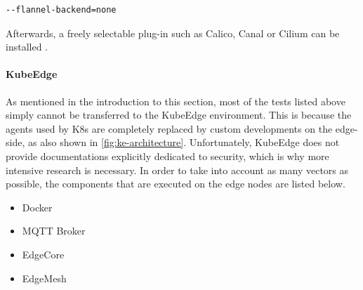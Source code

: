 \documentclass[MSC,Master,english]{twbook}%
\begin{document}
\begin{lstlisting}[caption={K3s no Flannel},captionpos=b]
--flannel-backend=none
\end{lstlisting}

Afterwards, a freely selectable plug-in such as Calico, Canal or Cilium can be installed \cite{k3s-network-conf}. 

\paragraph{KubeEdge} As mentioned in the introduction to this section, most of the tests listed above simply cannot be transferred to the KubeEdge environment. This is because the agents used by \ac{K8s} are completely replaced by custom developments on the edge-side, as also shown in \autoref{fig:ke-architecture}. Unfortunately, KubeEdge does not provide documentations explicitly dedicated to security, which is why more intensive research is necessary. In order to take into account as many vectors as possible, the components that are executed on the edge nodes are listed below.

\begin{itemize}
    \itemsep0em
    \item Docker
    \item MQTT Broker
    \item EdgeCore
    \item EdgeMesh
\end{itemize}
\end{document}
